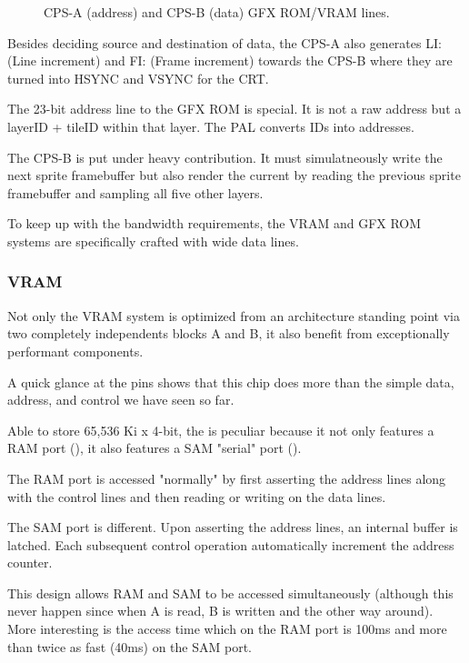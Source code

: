 \begin{figure}[H]
\caption*{CPS-A (address) and CPS-B (data) GFX ROM/VRAM lines.}
\end{figure}

Besides deciding source and destination of data, the CPS-A also generates LI: (Line increment) and FI: (Frame increment) towards the CPS-B where they are turned into HSYNC and VSYNC for the CRT.

The 23-bit address line to the GFX ROM is special. It is not a raw address but a layerID + tileID within that layer. The PAL  converts IDs into addresses.


The CPS-B is put under heavy contribution. It must simulatneously write the next sprite framebuffer but also render the current by reading the previous sprite framebuffer and sampling all five other layers.


To keep up with the bandwidth requirements, the VRAM and GFX ROM systems are specifically crafted with wide data lines.








\subsubsection{VRAM}
Not only the VRAM system is optimized from an architecture standing point via two completely independents blocks A and B, it also benefit from exceptionally performant components.

A quick glance at the  pins shows that this chip does more than the simple data, address, and control we have seen so far.


Able to store 65,536 Ki x 4-bit, the  is peculiar because it not only features a RAM port (), it also features a SAM "serial" port ().
 
The RAM port is accessed "normally" by first asserting the address lines along with the control lines and then reading or writing on the data lines.

The SAM port is different. Upon asserting the address lines, an internal buffer is latched. Each subsequent control operation automatically increment the address counter.

This design allows RAM and SAM to be accessed simultaneously (although this never happen since when A is read, B is written and the other way around).
 More interesting is the access time which on the RAM port is 100ms and more than twice as fast (40ms) on the SAM port. 

